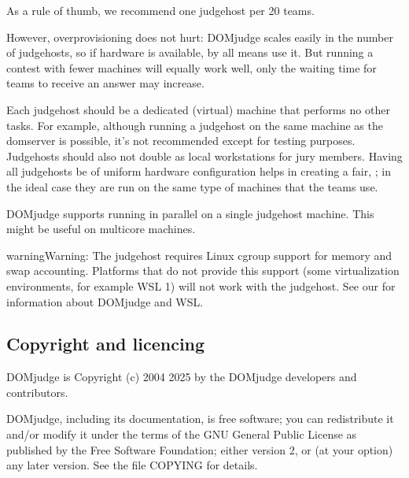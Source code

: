 \documentclass[a4paper,10pt,english,openany]{sphinxmanual}
\begin{document}
\sphinxAtStartPar
As a rule of thumb, we recommend one judgehost per 20 teams.

\sphinxAtStartPar
However, overprovisioning does not hurt: DOMjudge scales easily in the number
of judgehosts, so if hardware is available, by all means use it. But running a
contest with fewer machines will equally work well, only the waiting time for
teams to receive an answer may increase.

\sphinxAtStartPar
Each judgehost should be a dedicated (virtual) machine that performs no other
tasks. For example, although running a judgehost on the same machine as the
domserver is possible, it’s not recommended except for testing purposes.
Judgehosts should also not double as local workstations for jury members.
Having all judgehosts be of uniform hardware configuration helps in creating a
fair, {\hyperref[\detokenize{judging:judging-consistency}]{}}; in the ideal case
they are run on the same type of machines that the teams use.

\sphinxAtStartPar
DOMjudge supports running {\hyperref[\detokenize{config-advanced:multiple-judgedaemons}]{}}
in parallel on a single judgehost machine. This might be useful on multi\sphinxhyphen{}core
machines.

\begin{sphinxadmonition}{warning}{Warning:}
\sphinxAtStartPar
The judgehost requires Linux cgroup support for memory and swap accounting.
Platforms that do not provide this support (some virtualization environments,
for example WSL 1) will not work with the judgehost. See our  for information about DOMjudge and WSL.
\end{sphinxadmonition}


\subsection{Copyright and licencing}
\label{\detokenize{overview:copyright-and-licencing}}
\sphinxAtStartPar
DOMjudge is Copyright (c) 2004 \sphinxhyphen{} 2025 by the DOMjudge developers and contributors.

\sphinxAtStartPar
DOMjudge, including its documentation, is free software; you can redistribute
it and/or modify it under the terms of the GNU General Public License as
published by the Free Software Foundation; either version 2, or (at your
option) any later version. See the file COPYING for details.
\end{document}
